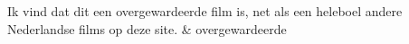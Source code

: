 \begin{appendices}
\begin{table}[]
\begin{tabu}
Ik vind dat dit een overgewardeerde film is, net als een heleboel andere Nederlandse films op deze site.                                                                                                                                                                                                                                                                                                                                                                                                                                                                                                                                                                                                                                                                                                                                                                                                                                                                                                                                                                                                                                                                                                                                                                                                                                                                                                                                                                                        & overgewardeerde                      \\ \hline
\end{tabu}
\end{table}






\end{appendices}
